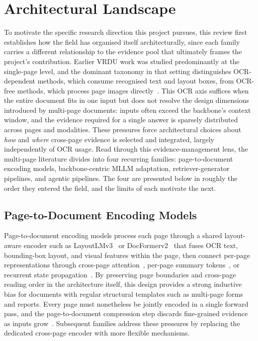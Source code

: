 \documentclass[11pt]{article}
\begin{document}
\section{Architectural Landscape}
\label{sec:architecture}

To motivate the specific research direction this project pursues, this review first establishes how the field has organised itself architecturally, since each family carries a different relationship to the evidence pool that ultimately frames the project's contribution. Earlier VRDU work was studied predominantly at the single-page level, and the dominant taxonomy in that setting distinguishes OCR-dependent methods, which consume recognised text and layout boxes, from OCR-free methods, which process page images directly~\cite{ding2025survey,huang2022layoutlmv3}. This OCR axis suffices when the entire document fits in one input but does not resolve the design dimensions introduced by multi-page documents: inputs often exceed the backbone's context window, and the evidence required for a single answer is sparsely distributed across pages and modalities. These pressures force architectural choices about \emph{how} and \emph{where} cross-page evidence is selected and integrated, largely independently of OCR usage. Read through this evidence-management lens, the multi-page literature divides into four recurring families: page-to-document encoding models, backbone-centric MLLM adaptation, retriever-generator pipelines, and agentic pipelines. The four are presented below in roughly the order they entered the field, and the limits of each motivate the next.

\subsection{Page-to-Document Encoding Models}
Page-to-document encoding models process each page through a shared layout-aware encoder such as LayoutLMv3~\cite{huang2022layoutlmv3} or DocFormerv2~\cite{appalaraju2024docformerv2} that fuses OCR text, bounding-box layout, and visual features within the page, then connect per-page representations through cross-page attention~\cite{blau2024gram,borchmann2025arctic}, per-page summary tokens~\cite{tito2023hierarchical}, or recurrent state propagation~\cite{dong2024multi}. By preserving page boundaries and cross-page reading order in the architecture itself, this design provides a strong inductive bias for documents with regular structural templates such as multi-page forms and reports. Every page must nonetheless be jointly encoded in a single forward pass, and the page-to-document compression step discards fine-grained evidence as inputs grow~\cite{blau2024gram,dong2024multi}. Subsequent families address these pressures by replacing the dedicated cross-page encoder with more flexible mechanisms.
\end{document}
